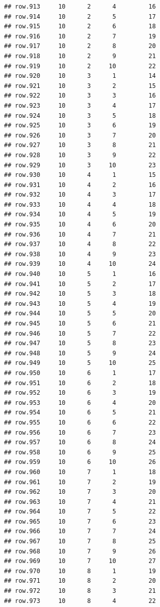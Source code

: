 \documentclass[
]{article}
\begin{document}
\begin{verbatim}
## row.913     10      2      4         16
## row.914     10      2      5         17
## row.915     10      2      6         18
## row.916     10      2      7         19
## row.917     10      2      8         20
## row.918     10      2      9         21
## row.919     10      2     10         22
## row.920     10      3      1         14
## row.921     10      3      2         15
## row.922     10      3      3         16
## row.923     10      3      4         17
## row.924     10      3      5         18
## row.925     10      3      6         19
## row.926     10      3      7         20
## row.927     10      3      8         21
## row.928     10      3      9         22
## row.929     10      3     10         23
## row.930     10      4      1         15
## row.931     10      4      2         16
## row.932     10      4      3         17
## row.933     10      4      4         18
## row.934     10      4      5         19
## row.935     10      4      6         20
## row.936     10      4      7         21
## row.937     10      4      8         22
## row.938     10      4      9         23
## row.939     10      4     10         24
## row.940     10      5      1         16
## row.941     10      5      2         17
## row.942     10      5      3         18
## row.943     10      5      4         19
## row.944     10      5      5         20
## row.945     10      5      6         21
## row.946     10      5      7         22
## row.947     10      5      8         23
## row.948     10      5      9         24
## row.949     10      5     10         25
## row.950     10      6      1         17
## row.951     10      6      2         18
## row.952     10      6      3         19
## row.953     10      6      4         20
## row.954     10      6      5         21
## row.955     10      6      6         22
## row.956     10      6      7         23
## row.957     10      6      8         24
## row.958     10      6      9         25
## row.959     10      6     10         26
## row.960     10      7      1         18
## row.961     10      7      2         19
## row.962     10      7      3         20
## row.963     10      7      4         21
## row.964     10      7      5         22
## row.965     10      7      6         23
## row.966     10      7      7         24
## row.967     10      7      8         25
## row.968     10      7      9         26
## row.969     10      7     10         27
## row.970     10      8      1         19
## row.971     10      8      2         20
## row.972     10      8      3         21
## row.973     10      8      4         22

\end{verbatim}
\end{document}
